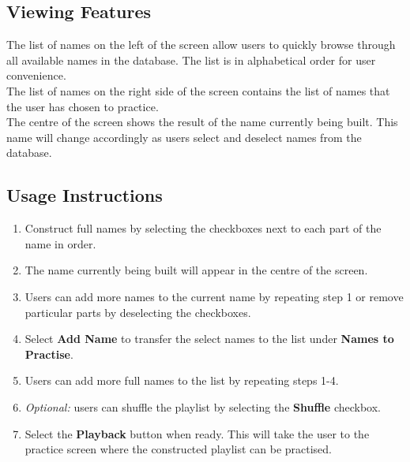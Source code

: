 \documentclass{article}
\begin{document}
\subsection{Viewing Features}
The list of names on the left of the screen allow users to quickly browse
through all available names in the database. The list is in alphabetical order
for user convenience. \\

The list of names on the right side of the screen contains the list of names
that the user has chosen to practice. \\

The centre of the screen shows the result of the name currently being built.
This name will change accordingly as users select and  deselect names from the
database.

\subsection{Usage Instructions}

\begin{enumerate}
	\item Construct full names by selecting the checkboxes next to each part of
	the name in order.

	\item The name currently being built will appear in the centre of the
	screen.

	\item Users can add more names to the current name by repeating step 1 or
	remove particular parts by deselecting the checkboxes.

	\item Select \textbf{Add Name} to transfer the select names to the list
	under \textbf{Names to Practise}.

	\item Users can add more full names to the list by repeating steps 1-4.

	\item {\em Optional: } users can shuffle the playlist by selecting the
	\textbf{Shuffle} checkbox.

	\item Select the \textbf{Playback} button when ready. This will take the
	user to the practice screen where the constructed playlist can be practised.

\end{enumerate}
\end{document}
